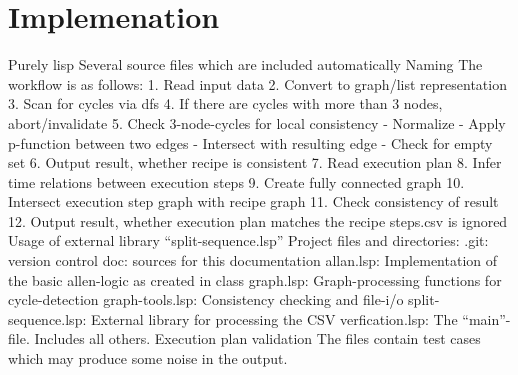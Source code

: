 \chapter{Implemenation}
\label{sec:impl}

    Purely lisp
    Several source files which are included automatically
    Naming
    The workflow is as follows:
        1. Read input data
        2. Convert to graph/list representation
        3. Scan for cycles via dfs
        4. If there are cycles with more than 3 nodes, abort/invalidate
        5. Check 3-node-cycles for local consistency
            - Normalize
            - Apply p-function between two edges
            - Intersect with resulting edge
            - Check for empty set
        6. Output result, whether recipe is consistent
        7. Read execution plan
        8. Infer time relations between execution steps
        9. Create fully connected graph
        10. Intersect execution step graph with recipe graph
        11. Check consistency of result
        12. Output result, whether execution plan matches the recipe
    steps.csv is ignored
    Usage of external library ``split-sequence.lsp''
    Project files and directories:
        .git: version control
        doc: sources for this documentation
        allan.lsp: Implementation of the basic allen-logic as created in class
        graph.lsp: Graph-processing functions for cycle-detection
        graph-tools.lsp: Consistency checking and file-i/o
        split-sequence.lsp: External library for processing the CSV
        verfication.lsp: The ``main''-file. Includes all others. Execution plan
        validation
    The files contain test cases which may produce some noise in the output.